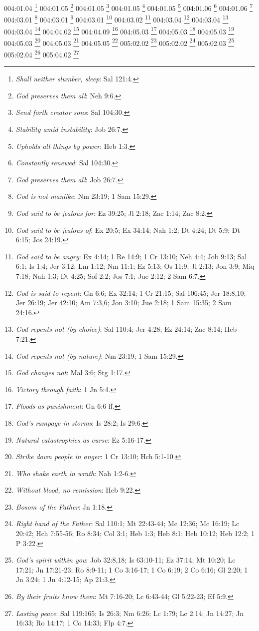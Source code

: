 {004:01.04 \footnote{\textit{Shall neither slumber, sleep}: Sal 121:4.}
004:01.05 \footnote{\textit{God preserves them all}: Neh 9:6.}
004:01.05 \footnote{\textit{Send forth creator sons}: Sal 104:30.}
004:01.05 \footnote{\textit{Stability amid instability}: Job 26:7.}
004:01.05 \footnote{\textit{Upholds all things by power}: Heb 1:3.}
004:01.06 \footnote{\textit{Constantly renewed}: Sal 104:30.}
004:01.06 \footnote{\textit{God preserves them all}: Job 26:7.}
004:03.01 \footnote{\textit{God is not manlike}: Nm 23:19; 1 Sam 15:29.}
004:03.01 \footnote{\textit{God said to be jealous for}: Ez 39:25; Jl 2:18; Zac 1:14; Zac 8:2.}
004:03.01 \footnote{\textit{God said to be jealous of}: Ex 20:5; Ex 34:14; Nah 1:2; Dt 4:24; Dt 5:9; Dt 6:15; Jos 24:19.}
004:03.02 \footnote{\textit{God said to be angry}: Ex 4:14; 1 Re 14:9; 1 Cr 13:10; Neh 4:4; Job 9:13; Sal 6:1; Is 1:4; Jer 3:12; Lm 1:12; Nm 11:1; Ez 5:13; Os 11:9; Jl 2:13; Jon 3:9; Miq 7:18; Nah 1:3; Dt 4:25; Sof 2:2; Jos 7:1; Jue 2:12; 2 Sam 6:7.}
004:03.04 \footnote{\textit{God is said to repent}: Gn 6:6; Ex 32:14; 1 Cr 21:15; Sal 106:45; Jer 18:8,10; Jer 26:19; Jer 42:10; Am 7:3,6; Jon 3:10; Jue 2:18; 1 Sam 15:35; 2 Sam 24:16.}
004:03.04 \footnote{\textit{God repents not (by choice)}: Sal 110:4; Jer 4:28; Ez 24:14; Zac 8:14; Heb 7:21.}
004:03.04 \footnote{\textit{God repents not (by nature)}: Nm 23:19; 1 Sam 15:29.}
004:04.02 \footnote{\textit{God changes not}: Mal 3:6; Stg 1:17.}
004:04.09 \footnote{\textit{Victory through faith}: 1 Jn 5:4.}
004:05.03 \footnote{\textit{Floods as punishment}: Gn 6:6 ff.}
004:05.03 \footnote{\textit{God's rampage in storms}: Is 28:2; Is 29:6.}
004:05.03 \footnote{\textit{Natural catastrophies as curse}: Ez 5:16-17.}
004:05.03 \footnote{\textit{Strike down people in anger}: 1 Cr 13:10; Hch 5:1-10.}
004:05.03 \footnote{\textit{Who shake earth in wrath}: Nah 1:2-6.}
004:05.05 \footnote{\textit{Without blood, no remission}: Heb 9:22.}
005:02.02 \footnote{\textit{Bosom of the Father}: Jn 1:18.}
005:02.02 \footnote{\textit{Right hand of the Father}: Sal 110:1; Mt 22:43-44; Mc 12:36; Mc 16:19; Lc 20:42; Hch 7:55-56; Ro 8:34; Col 3:1; Heb 1:3; Heb 8:1; Heb 10:12; Heb 12:2; 1 P 3:22.}
005:02.03 \footnote{\textit{God's spirit within you}: Job 32:8,18; Is 63:10-11; Ez 37:14; Mt 10:20; Lc 17:21; Jn 17:21-23; Ro 8:9-11; 1 Co 3:16-17; 1 Co 6:19; 2 Co 6:16; Gl 2:20; 1 Jn 3:24; 1 Jn 4:12-15; Ap 21:3.}
005:02.04 \footnote{\textit{By their fruits know them}: Mt 7:16-20; Lc 6:43-44; Gl 5:22-23; Ef 5:9.}
005:04.02 \footnote{\textit{Lasting peace}: Sal 119:165; Is 26:3; Nm 6:26; Lc 1:79; Lc 2:14; Jn 14:27; Jn 16:33; Ro 14:17; 1 Co 14:33; Flp 4:7.}
}
